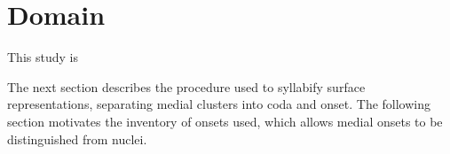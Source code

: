 \section{Domain}

This study is 

The next section describes the procedure used to syllabify surface representations, separating medial clusters into coda and onset. The following section motivates the inventory of onsets used, which allows medial onsets to be distinguished from nuclei.




